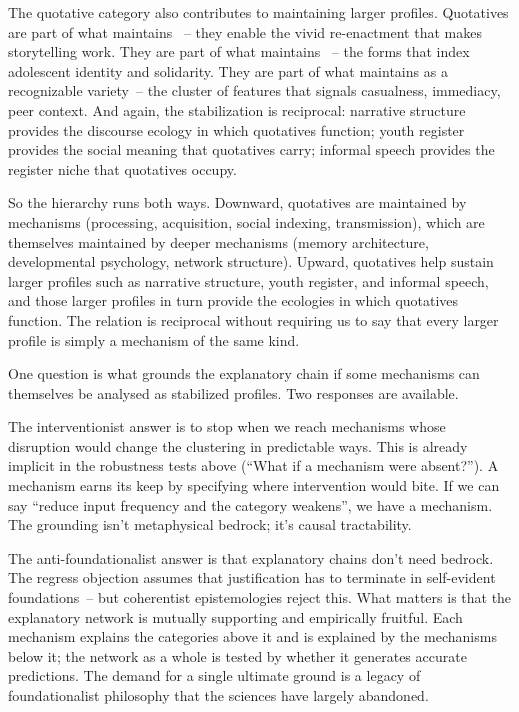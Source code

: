 The quotative category also contributes to maintaining larger profiles. Quotatives are part of what maintains ~-- they enable the vivid re-enactment that makes storytelling work. They are part of what maintains ~-- the forms that index adolescent identity and solidarity. They are part of what maintains  as a recognizable variety~-- the cluster of features that signals casualness, immediacy, peer context. And again, the stabilization is reciprocal: narrative structure provides the discourse ecology in which quotatives function; youth register provides the social meaning that quotatives carry; informal speech provides the register niche that quotatives occupy.

So the hierarchy runs both ways. Downward, quotatives are maintained by mechanisms (processing, acquisition, social indexing, transmission), which are themselves maintained by deeper mechanisms (memory architecture, developmental psychology, network structure). Upward, quotatives help sustain larger profiles such as narrative structure, youth register, and informal speech, and those larger profiles in turn provide the ecologies in which quotatives function. The relation is reciprocal without requiring us to say that every larger profile is simply a mechanism of the same kind.


One question is what grounds the explanatory chain if some mechanisms can themselves be analysed as stabilized profiles. Two responses are available.

The interventionist answer is to stop when we reach mechanisms whose disruption would change the clustering in predictable ways. This is already implicit in the robustness tests above (\enquote{What if a mechanism were absent?}). A mechanism earns its keep by specifying where intervention would bite. If we can say \enquote{reduce input frequency and the category weakens}, we have a mechanism. The grounding isn't metaphysical bedrock; it's causal tractability.

The anti-foundationalist answer is that explanatory chains don't need bedrock. The regress objection assumes that justification has to terminate in self-evident foundations~-- but coherentist epistemologies reject this. What matters is that the explanatory network is mutually supporting and empirically fruitful. Each mechanism explains the categories above it and is explained by the mechanisms below it; the network as a whole is tested by whether it generates accurate predictions. The demand for a single ultimate ground is a legacy of foundationalist philosophy that the sciences have largely abandoned.

